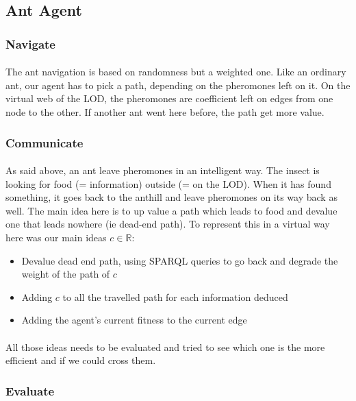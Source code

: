 \documentclass{article}
\newenvironment{itemh}[0]{\begin{itemize}[label=$\heartsuit$, font=\color{mygray} \small]}{\end{itemize}}
\begin{document}
	\subsection{Ant Agent}
		\subsubsection{Navigate}
			\paragraph{}
			The ant navigation is based on randomness but a weighted one.
			Like an ordinary ant, our agent has to pick a path, depending on the pheromones left on it.
			On the virtual web of the LOD, the pheromones are coefficient left on edges from one node to the other.
			If another ant went here before, the path get more value.			
		\subsubsection{Communicate}
			\paragraph{}
			As said above, an ant leave pheromones in an intelligent way.
			The insect is looking for food (= information) outside (= on the LOD).
			When it has found something, it goes back to the anthill and leave pheromones on its way back as well.
			The main idea here is to up value a path which leads to food and devalue one that leads nowhere (ie dead-end path).
			To represent this in a virtual way here was our main ideas $c \in \mathbb{R}$:
			\begin{itemh}
				\item Devalue dead end path, using SPARQL queries to go back and degrade the weight of the path of $c$
				\item Adding $c$ to all the travelled path for each information deduced
				\item Adding the agent's current fitness to the current edge
			\end{itemh}
			\paragraph{}
				All those ideas needs to be evaluated and tried to see which one is the more efficient and if we could cross them.
		\subsubsection{Evaluate}
\end{document}
